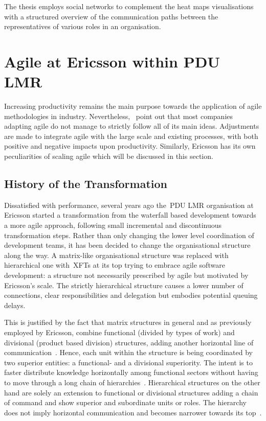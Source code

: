 The thesis employs social networks to complement the heat maps visualisations with a structured overview of the communication paths between the representatives of various roles in an organisation.

\section{Agile at Ericsson within PDU LMR}

Increasing productivity remains the main purpose towards the application of agile methodologies in industry. Nevertheless,~\citet{badampudi2013proddelay} point out that most companies adapting agile do not manage to strictly follow all of its main ideas. Adjustments are made to integrate agile with the large scale and existing processes, with both positive and negative impacts upon productivity. Similarly, Ericsson has its own peculiarities of scaling agile which will be discussed in this section.

\subsection{History of the Transformation}

Dissatisfied with performance, several years ago the~\ac{PDU LMR} organisation at Ericsson started a transformation from the waterfall based development towards a more agile approach, following small incremental and discontinuous transformation steps. Rather than only changing the lower level coordination of development teams, it has been decided to change the organisational structure along the way. A matrix-like organisational structure was replaced with hierarchical one with~\acp{XFT} at its top trying to embrace agile software development: a structure not necessarily prescribed by agile but motivated by Ericsson's scale. The strictly hierarchical structure causes a lower number of connections, clear responsibilities and delegation but embodies potential queuing delays. 

This is justified by the fact that matrix structures in general and as previously employed by Ericsson, combine functional (divided by types of work) and divisional (product based division) structures, adding another horizontal line of communication~\citep{price2007hrm}. Hence, each unit within the structure is being coordinated by two superior entities: a functional- and a divisional superiority. The intent is to faster distribute knowledge horizontally among functional sectors without having to move through a long chain of hierarchies~\citep{galbraith2008matrix}. 
Hierarchical structures on the other hand are solely an extension to functional or divisional structures adding a chain of command and show superior and subordinate units or roles. The hierarchy does not imply horizontal communication and becomes narrower towards its top~\citep{healeyprojectmanagement}.

